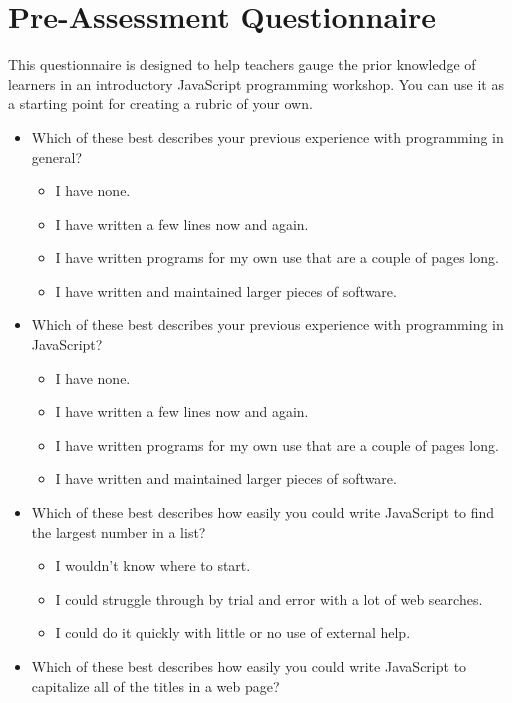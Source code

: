 \chapter{Pre-Assessment Questionnaire}\label{s:preassess}

This questionnaire is designed to help teachers gauge the prior
knowledge of learners in an introductory JavaScript programming
workshop. You can use it as a starting point for creating a rubric of
your own.

\begin{itemize}
\tightlist
\item
  Which of these best describes your previous experience with
  programming in general?

  \begin{itemize}
  \tightlist
  \item
    I have none.
  \item
    I have written a few lines now and again.
  \item
    I have written programs for my own use that are a couple of
    pages long.
  \item
    I have written and maintained larger pieces of software.
  \end{itemize}
\item
  Which of these best describes your previous experience with
  programming in JavaScript?

  \begin{itemize}
  \tightlist
  \item
    I have none.
  \item
    I have written a few lines now and again.
  \item
    I have written programs for my own use that are a couple of
    pages long.
  \item
    I have written and maintained larger pieces of software.
  \end{itemize}
\item
  Which of these best describes how easily you could write JavaScript
  to find the largest number in a list?

  \begin{itemize}
  \tightlist
  \item
    I wouldn't know where to start.
  \item
    I could struggle through by trial and error with a lot of web
    searches.
  \item
    I could do it quickly with little or no use of external help.
  \end{itemize}
\item
  Which of these best describes how easily you could write JavaScript
  to capitalize all of the titles in a web page?


\end{itemize}
